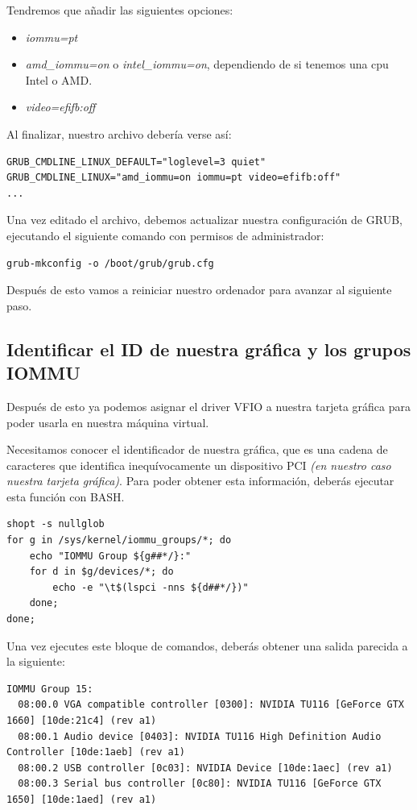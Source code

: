 \documentclass[12pt]{article}
\begin{document}
Tendremos que añadir las siguientes opciones:

\begin{itemize}
\setlength\itemsep{-0.2em}
\item \emph{iommu=pt}
\item \emph{amd\_iommu=on} o \emph{intel\_iommu=on}, dependiendo de si tenemos una cpu Intel o AMD.
\item \emph{video=efifb:off}
\end{itemize}

Al finalizar, nuestro archivo debería verse así:

\begin{verbatim}
GRUB_CMDLINE_LINUX_DEFAULT="loglevel=3 quiet"
GRUB_CMDLINE_LINUX="amd_iommu=on iommu=pt video=efifb:off"
...
\end{verbatim}

Una vez editado el archivo, debemos actualizar nuestra configuración de GRUB, ejecutando el siguiente comando con permisos de administrador:

\begin{verbatim}
grub-mkconfig -o /boot/grub/grub.cfg
\end{verbatim}

Después de esto vamos a reiniciar nuestro ordenador para avanzar al siguiente paso.

\subsection{Identificar el ID de nuestra gráfica y los grupos IOMMU}

Después de esto ya podemos asignar el driver VFIO a nuestra tarjeta gráfica para poder usarla en nuestra máquina virtual.

Necesitamos conocer el identificador de nuestra gráfica, que es una cadena de caracteres que identifica inequívocamente un dispositivo PCI \emph{(en nuestro caso nuestra tarjeta gráfica)}. Para poder obtener esta información, deberás ejecutar esta función con BASH.

\begin{verbatim}
shopt -s nullglob
for g in /sys/kernel/iommu_groups/*; do
    echo "IOMMU Group ${g##*/}:"
    for d in $g/devices/*; do
        echo -e "\t$(lspci -nns ${d##*/})"
    done;
done;
\end{verbatim}

Una vez ejecutes este bloque de comandos, deberás obtener una salida parecida a la siguiente:

\begin{lstlisting}[basicstyle=\scriptsize\ttfamily]
IOMMU Group 15:
  08:00.0 VGA compatible controller [0300]: NVIDIA TU116 [GeForce GTX 1660] [10de:21c4] (rev a1)
  08:00.1 Audio device [0403]: NVIDIA TU116 High Definition Audio Controller [10de:1aeb] (rev a1)
  08:00.2 USB controller [0c03]: NVIDIA Device [10de:1aec] (rev a1)
  08:00.3 Serial bus controller [0c80]: NVIDIA TU116 [GeForce GTX 1650] [10de:1aed] (rev a1)
\end{lstlisting}
\end{document}
